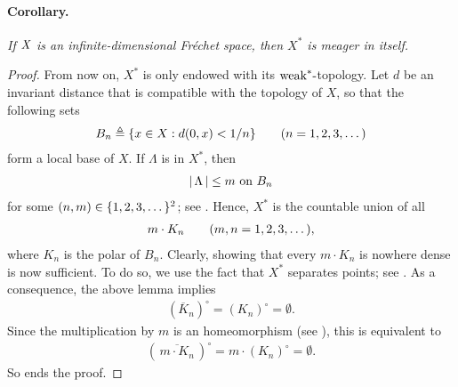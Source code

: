 \paragraph{Corollary.}%
{\it If $\mathit{X}$ is an infinite-dimensional Fréchet space, %
then $\mathit{X^\ast}$ is meager in itself.
}
%
\begin{proof}%
From now on, $X^\ast$ is only endowed with its $\text{weak}^\ast\text{-}$topology. %
Let $d$ be an invariant distance that is compatible with the topology of $X$, %
so that the following sets
%
  \begin{align}
    B_n \triangleq \{x\in X: d(0, x) <  1/n\}\quad\quad (n=1, 2, 3, \dots) 
  \end{align}
%
form a local base of $X$. %
%
If $\Lambda$ is in $X^\ast$, then %
%
  \begin{align}
    \left\lvert\, \Lambda \,\right\rvert \leq  m \text{ on } B_n
  \end{align}
%
for some $(n, m) \in \{1, 2, 3, \dots\}^2$; see . %
%
Hence, $X^\ast$ is the countable union of all %
%
  \begin{align}\label{3.11. Countable union.}
    m\cdot K_n \quad\quad (m,n=1, 2, 3, \dots), 
  \end{align}
%
where $K_n$ is the polar of $B_n$. %
Clearly, showing that every $m\cdot K_n$ is nowhere dense %
is now sufficient. %
To do so, we use the fact that $X^\ast$ separates points; %
see . %
As a consequence, the above lemma implies %
%
  \begin{align}
    \left({\overline{K}_n}\right)^\circ = \left({{K}_n}\right)^\circ=\emptyset. 
  \end{align}
%
Since the multiplication by $m$ is an homeomorphism (see ), %
this is equivalent to %
%
  \begin{align}\label{3.11. Nowhere dense.}
    \left(\,{\overline{m\cdot K_n}}\, \right)^\circ 
      = 
    m\cdot \left({{K}_n}\right)^\circ 
      = 
    \emptyset.
  \end{align}
%
So ends the proof.%
\end{proof}